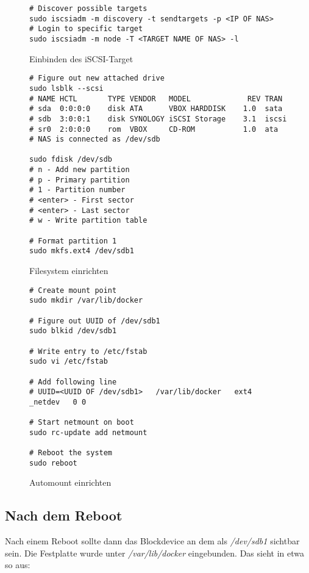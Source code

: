 \documentclass[12pt,a4paper]{article}
\newcommand{\code}[1]{\textit{#1}}
\begin{document}
\begin{figure}[H]
\begin{lstlisting}
# Discover possible targets
sudo iscsiadm -m discovery -t sendtargets -p <IP OF NAS>
# Login to specific target
sudo iscsiadm -m node -T <TARGET NAME OF NAS> -l
\end{lstlisting}
\caption{Einbinden des iSCSI-Target}\label{fig:Einbinden des iSCSI-Target}
\end{figure}

\begin{figure}[H]
\begin{lstlisting}
# Figure out new attached drive
sudo lsblk --scsi
# NAME HCTL       TYPE VENDOR   MODEL             REV TRAN
# sda  0:0:0:0    disk ATA      VBOX HARDDISK    1.0  sata
# sdb  3:0:0:1    disk SYNOLOGY iSCSI Storage    3.1  iscsi
# sr0  2:0:0:0    rom  VBOX     CD-ROM           1.0  ata
# NAS is connected as /dev/sdb

sudo fdisk /dev/sdb
# n - Add new partition
# p - Primary partition
# 1 - Partition number
# <enter> - First sector
# <enter> - Last sector
# w - Write partition table

# Format partition 1
sudo mkfs.ext4 /dev/sdb1
\end{lstlisting}
\caption{Filesystem einrichten}\label{fig:Filesystem einrichten}
\end{figure}

\begin{figure}[H]
\begin{lstlisting}
# Create mount point
sudo mkdir /var/lib/docker

# Figure out UUID of /dev/sdb1
sudo blkid /dev/sdb1

# Write entry to /etc/fstab
sudo vi /etc/fstab

# Add following line
# UUID=<UUID OF /dev/sdb1>   /var/lib/docker   ext4   _netdev   0 0

# Start netmount on boot
sudo rc-update add netmount

# Reboot the system
sudo reboot
\end{lstlisting}
\caption{Automount einrichten}\label{fig:Automount einrichten}
\end{figure}

\subsection{Nach dem Reboot}
Nach einem Reboot sollte dann das Blockdevice an dem als \code{/dev/sdb1} sichtbar sein.
Die Festplatte wurde unter \code{/var/lib/docker} eingebunden. Das sieht in etwa so aus:
\end{document}
